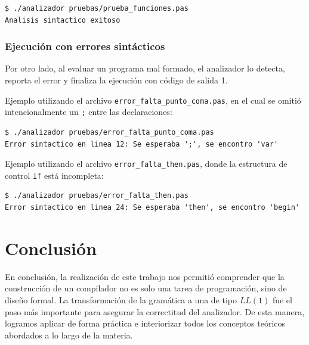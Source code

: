 \documentclass[12pt]{article}
\begin{document}
\begin{lstlisting}[frame=single, basicstyle=\ttfamily\small]
$ ./analizador pruebas/prueba_funciones.pas
Analisis sintactico exitoso
\end{lstlisting}

\subsubsection*{Ejecución con errores sintácticos}
Por otro lado, al evaluar un programa mal formado, el analizador lo detecta, reporta el error y finaliza la ejecución con código de salida 1. 

Ejemplo utilizando el archivo \texttt{error\_falta\_punto\_coma.pas}, en el cual se omitió intencionalmente un \texttt{;} entre las declaraciones:

\begin{lstlisting}[frame=single, basicstyle=\ttfamily\small]
$ ./analizador pruebas/error_falta_punto_coma.pas
Error sintactico en linea 12: Se esperaba ';', se encontro 'var'
\end{lstlisting}

Ejemplo utilizando el archivo \texttt{error\_falta\_then.pas}, donde la estructura de control \texttt{if} está incompleta:

\begin{lstlisting}[frame=single, basicstyle=\ttfamily\small]
$ ./analizador pruebas/error_falta_then.pas
Error sintactico en linea 24: Se esperaba 'then', se encontro 'begin'
\end{lstlisting}



\section{Conclusión}
En conclusión, la realización de este trabajo nos permitió comprender que la construcción de un compilador no es solo una tarea de programación, sino de diseño formal. La transformación de la gramática a una de tipo $LL(1)$ fue el paso más importante para asegurar la correctitud del analizador. De esta manera, logramos aplicar de forma práctica e interiorizar todos los conceptos teóricos abordados a lo largo de la materia.
\end{document}
